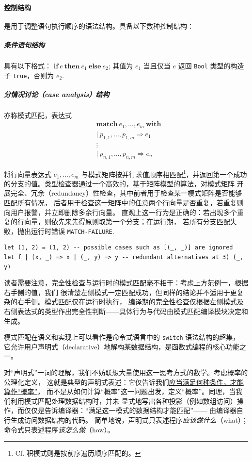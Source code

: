\paragraph{控制结构} 是用于调整语句执行顺序的语法结构。\Tigris 具备以下数种控制结构：
{\setlength{\parskip}{-1em}
  \subparagraph{条件语句结构} 具有以下格式：
  \(\mathbf{if}\ e\ \mathbf{then}\ e_1\ \mathbf{else}\ e_2\); 其值为 \(e_1\) 当且仅当 \(e\)
  返回 \texttt{Bool} 类型的构造子 \texttt{true}，否则为 \(e_2\).
  \subparagraph{分情况讨论（case analysis）结构} 亦称模式匹配，表达式
  {\setlength{\abovedisplayskip}{3pt}\setlength{\belowdisplayskip}{3pt}
    \begin{equation}
      \begin{aligned}
        &\mathbf{match}\ e_1,\dots, e_m\ \mathbf{with}\\[-10pt]
        &\vert\ p_{1,1},\dots,p_{1,m}\Rightarrow e_1 \\[-10pt]
        &\vdots\\[-10pt]
        &\vert\ p_{n,1},\dots,p_{n,m}\Rightarrow e_{n}
      \end{aligned}
\end{equation}}}
将行向量表达式 $e_1,\dots, e_m$ 与模式矩阵按并行求值顺序相匹配\footnote{
  Cf. 积模式则是按前序遍历顺序匹配的。
}，并返回第一个成功的分支的值。类型检查器通过一个高效的，基于矩阵模型的算法，对模式矩阵
开展完全、冗余（redundancy）性检查，其中前者用于检查某一模式矩阵是否能够匹配所有情况，
后者用于检查这一矩阵中的任意两个行向量是否重复，若重复则向用户报警，并立即删除多余行向量。
直观上这一行为是正确的：若出现多个重复的行向量，则依先来先得原则取第一个分支；在运行期，
若所有分支匹配失败，抛出运行时错误 \texttt{MATCH-FAILURE}.
\begin{verbatim}
let (1, 2) = (1, 2) -- possible cases such as [(_, _)] are ignored
let f | (x, _) => x | (_, y) => y -- redundant alternatives at 3) (_, y)
\end{verbatim}
读者需要注意，完全性检查与运行时的模式匹配毫不相干：考虑上方范例一，根据右手侧的值，我们
很清楚左侧模式一定匹配成功，但同样的结论并不适用于更复杂的右手侧。模式匹配仅在运行时执行，
编译期的完全性检查仅根据左侧模式及右侧表达式的类型作出完全性判断——具体行为与代码由模式匹配编译模块决定和生成。

模式匹配在语义和实现上可以看作是命令式语言中的 \texttt{switch} 语法结构的超集，
它允许用户声明式（declarative）地解构某数据结构，是函数式编程的核心功能之一。

对“声明式”一词的理解，我们不妨联想大量使用这一思考方式的数学。考虑概率的公理化定义，
这就是典型的声明式表述：它仅告诉我们\underline{应当满足何种条件，才能算作“概率”}，
而不是从如何计算“概率”这一问题出发，定义“概率”。同理，当我们利用模式匹配处理数据结构时，并未
显式地写出各种投影（例如数组访问）操作，而仅仅是告诉编译器：“满足这一模式的数据结构才能匹配”——
由编译器自行生成访问数据结构的代码。
简单地说，声明式只表述程序\emph{应该做什么}（what）；命令式只表述程序\emph{该怎么做}（how）。

